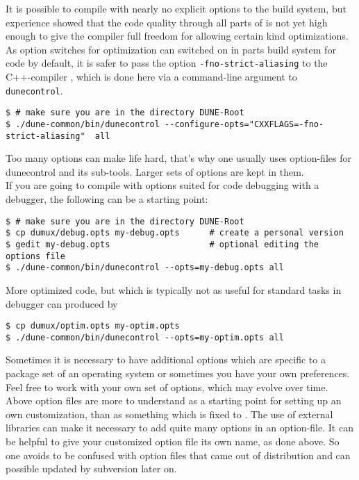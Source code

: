 It is possible to compile \Dumux with nearly no explicit options to the build system, but
experience showed that the code quality through all parts of \Dune is not yet high enough to give the compiler full 
freedom for allowing certain kind optimizations. As option switches for optimization can switched on in parts
build system for code by default, it is safer to pass the option \texttt{-fno-strict-aliasing} to the C++-compiler
\cite{WIKIPED-ALIASING}, which is done here via a command-line argument to \texttt{dunecontrol}.


\begin{lstlisting}[style=Bash]
$ # make sure you are in the directory DUNE-Root
$ ./dune-common/bin/dunecontrol --configure-opts="CXXFLAGS=-fno-strict-aliasing"  all
\end{lstlisting}

Too many options can make life hard, that's why one usually uses option-files for dunecontrol and its sub-tools.
Larger sets of options are kept in them. \\

If you are going to compile with options suited for code debugging with a debugger, the following
can be a starting point:


\begin{lstlisting}[style=Bash]
$ # make sure you are in the directory DUNE-Root
$ cp dumux/debug.opts my-debug.opts      # create a personal version
$ gedit my-debug.opts                    # optional editing the options file 
$ ./dune-common/bin/dunecontrol --opts=my-debug.opts all 
\end{lstlisting}

More optimized code, but which is typically not as useful for standard tasks in debugger can produced by 

\begin{lstlisting}[style=Bash]
$ cp dumux/optim.opts my-optim.opts 
$ ./dune-common/bin/dunecontrol --opts=my-optim.opts all
\end{lstlisting}

Sometimes it is necessary to have additional options which
are specific to a package set of an operating system or
sometimes you have your own preferences.
Feel free to work with your own set of options, which may evolve over time.
Above option files are more to understand as a starting point
for setting up an own customization, than as something which is fixed to \Dumux.
The use of external libraries can make it necessary to add quite many options in an option-file.
It can be helpful to give your customized option file its own name, as done above.
So one avoids to be confused with option files that came out of distribution
and can possible updated by subversion later on.

